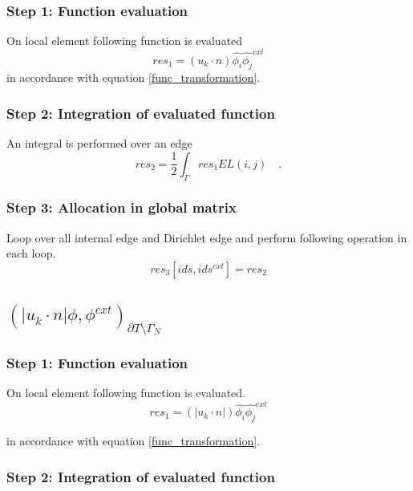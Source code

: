 \documentclass[a4paper]{book}
\begin{document}
\subsubsection{Step 1: Function evaluation}

On local element following function is evaluated 
\begin{equation}
res_1  = (u_k \cdot n) \hat{\phi_i} \hat{\phi_j}^{ext} 
\end{equation}
in accordance with equation \ref{func_transformation}.

\subsubsection{Step 2: Integration of evaluated function}

An integral is performed over an edge
\begin{equation}
res_2 = \frac{1}{2} \int_{\Gamma} res_1 EL(i,j) \quad \textrm{.}
\end{equation}

\subsubsection{Step 3: Allocation in global matrix}

Loop over all internal edge and Dirichlet edge and perform following operation in each loop.
\begin{equation}
res_3[ids,ids^{ext}] = res_2
\end{equation}

\subsection{$(|u_k \cdot n| \phi,\phi^{ext})_{\partial T \setminus \Gamma_N}$} 

\subsubsection{Step 1: Function evaluation}

On local element following function is evaluated.
\begin{equation}
res_1 = (|u_k \cdot n|) \hat{\phi_i} \hat{\phi_j}^{ext} 
\end{equation}

in accordance with equation \ref{func_transformation}.\\

\subsubsection{Step 2: Integration of evaluated function}
\end{document}
